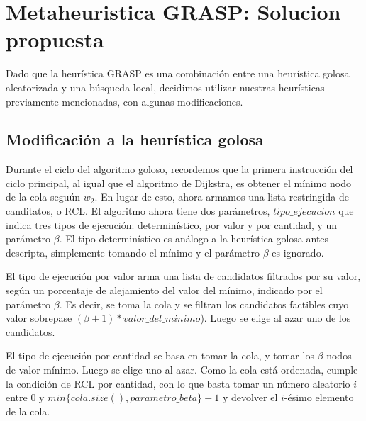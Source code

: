 \section{Metaheuristica GRASP: Solucion propuesta}

Dado que la heur\'istica GRASP es una combinaci\'on entre una heur\'istica golosa aleatorizada y una b\'usqueda local, decidimos utilizar nuestras heur\'isticas previamente mencionadas, con algunas modificaciones.

\subsection{Modificaci\'on a la heur\'istica golosa}

\vspace{2mm}

Durante el ciclo del algoritmo goloso, recordemos que la primera instrucci\'on del ciclo principal, al igual que el algoritmo de Dijkstra, es obtener el m\'inimo nodo de la cola segu\'un $w_2$. En lugar de esto, ahora armamos una lista restringida de canditatos, o RCL. El algoritmo ahora tiene dos par\'ametros, $tipo\_ejecucion$ que indica tres tipos de ejecuci\'on: determin\'istico, por valor y por cantidad, y un par\'ametro $\beta$. El tipo determin\'istico es an\'alogo a la heur\'istica golosa antes descripta, simplemente tomando el m\'inimo y el par\'ametro $\beta$ es ignorado.

\vspace{2mm}

El tipo de ejecuci\'on por valor arma una lista de candidatos filtrados por su valor, seg\'un un porcentaje de alejamiento del valor del m\'inimo, indicado por el par\'ametro $\beta$. Es decir, se toma la cola y se filtran los candidatos factibles cuyo valor sobrepase $(\beta + 1)*valor\_del\_minimo$). Luego se elige al azar uno de los candidatos. 
\vspace{2mm}

El tipo de ejecuci\'on por cantidad se basa en tomar la cola, y tomar los $\beta$ nodos de valor m\'inimo. Luego se elige uno al azar. Como la cola est\'a ordenada, cumple la condici\'on de RCL por cantidad, con lo que basta tomar un n\'umero aleatorio $i$ entre $0$ y  $min\{cola.size(), parametro\_beta\} -1$ y devolver el $i$-\'esimo elemento de la cola.

\vspace{2mm}

